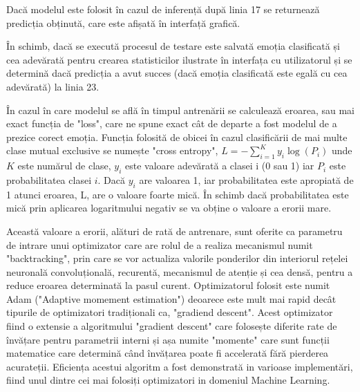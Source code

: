 \documentclass[a4paper,12pt]{book}
\begin{document}
		Dacă modelul este folosit în cazul de inferență după linia 17 se returnează predicția obținută, care este afișată în interfață grafică. \par
		În schimb, dacă se execută procesul de testare este salvată emoția clasificată și cea adevărată pentru crearea statisticilor ilustrate în interfața cu utilizatorul și se determină dacă predicția a avut succes (dacă emoția clasificată este egală cu cea adevărată) la linia 23. \par
		În cazul în care modelul se află în timpul antrenării se calculează eroarea, sau mai exact funcția de "loss", care ne spune exact cât de departe a fost modelul de a prezice corect emoția. Funcția folosită de obicei în cazul clasificării de mai multe clase mutual exclusive se numește "cross entropy", $L = -\sum_{i=1}^{K} y_i \log(P_i)$ unde $K$ este numărul de clase, $y_i$ este valoare adevărată a clasei i (0 sau 1) iar $P_i$ este probabilitatea clasei $i$. Dacă $y_i$ are valoarea 1, iar probabilitatea este apropiată de 1 atunci eroarea, L, are o valoare foarte mică. În schimb dacă probabilitatea este mică prin aplicarea logaritmului negativ se va obține o valoare a erorii mare. \par
		Această valoare a erorii, alături de rată de antrenare, sunt oferite ca parametru de intrare unui optimizator care are rolul de a realiza mecanismul numit "backtracking", prin care se vor actualiza valorile ponderilor din interiorul rețelei neuronală convoluțională, recurentă, mecanismul de atenție și cea densă, pentru a reduce eroarea determinată la pasul curent. Optimizatorul folosit este numit Adam \cite{adam} ("Adaptive momement estimation") deoarece este mult mai rapid decât tipurile de optimizatori tradiționali ca, "gradiend descent". Acest optimizator fiind o extensie a algoritmului "gradient descent"	care folosește diferite rate de învățare pentru parametrii interni și așa numite "momente" care sunt funcții matematice care determină când învățarea poate fi accelerată fără pierderea acurateții. Eficiența acestui algoritm a fost demonstrată in varioase implementări, fiind unul dintre cei mai folosiți optimizatori in domeniul Machine Learning.
		
\end{document}
